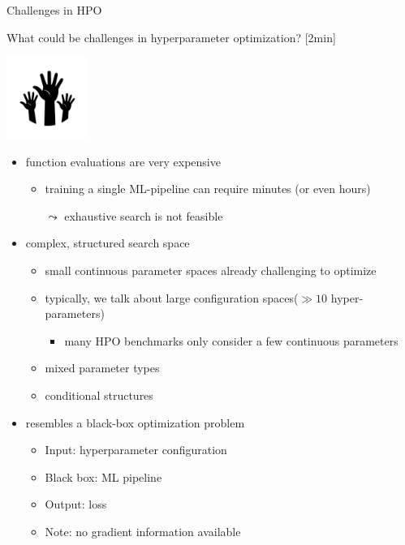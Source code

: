 \begin{frame}[c]{Challenges in HPO}
{%
	\centering
	
	\vspace*{2.25cm}
	
	What could be challenges in hyperparameter optimization? [2min]
	
	\bigskip
	
	\includegraphics[width=0.2\textwidth]{images/hands.png}
}%
\pause
\begin{itemize}
  \item function evaluations are very expensive
  \begin{itemize}
    \item training a single ML-pipeline can require minutes (or even hours) 
    \item[$\leadsto$] exhaustive search is not feasible
  \end{itemize}
  \pause
  \medskip
  \item complex, structured search space
  \begin{itemize}
    \item small continuous parameter spaces already challenging to optimize
    \item typically, we talk about large configuration spaces\newline ($\gg 10$ hyper-parameters)
    \begin{itemize}
      \item many HPO benchmarks only consider a few continuous parameters
    \end{itemize}
    \item mixed parameter types
    \item conditional structures
  \end{itemize}
  \pause
  \medskip
  \item resembles a black-box optimization problem
  \begin{itemize}
    \item Input: hyperparameter configuration
    \item Black box: ML pipeline 
    \item Output: loss
    \item Note: no gradient information available
  \end{itemize}
\end{itemize}

\end{frame}
